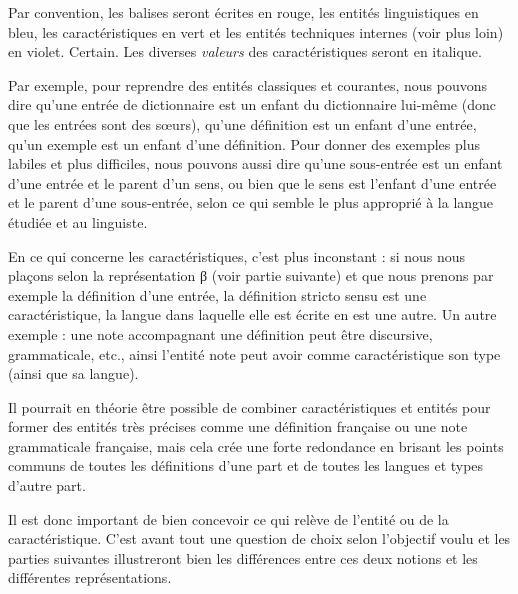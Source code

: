 \documentclass[10pt]{report}
\newcommand{\balise}[1]{\textcolor{red!80}{#1}}
\newcommand{\entité}[1]{\textcolor{blue!60!black}{#1}}
\newcommand{\caractéristique}[1]{\textcolor{green!60!black}{#1}}
\newcommand{\entitétechnique}[1]{\textcolor{blue!50!red}{#1}}
\begin{document}
Par convention, les \balise{balises} seront écrites en rouge, les \entité{entités linguistiques} en bleu, les \caractéristique{caractéristiques} en vert et les \entitétechnique{entités techniques internes} (voir plus loin) en violet. Certain. Les diverses \textit{valeurs} des caractéristiques seront en italique.

\bigskip

Par exemple, pour reprendre des entités classiques et courantes, nous pouvons dire qu’une \entité{entrée} de dictionnaire est un enfant du \entité{dictionnaire} lui-même (donc que les \entité{entrées} sont des sœurs), qu’une \entité{définition} est un enfant d’une \entité{entrée}, qu’un \entité{exemple} est un enfant d’une \entité{définition}. Pour donner des exemples plus labiles et plus difficiles, nous pouvons aussi dire qu’une \entité{sous-entrée} est un enfant d’une \entité{entrée} et le parent d’un \entité{sens}, ou bien que le \entité{sens} est l’enfant d’une \entité{entrée} et le parent d’une \entité{sous-entrée}, selon ce qui semble le plus approprié à la langue étudiée et au linguiste.

En ce qui concerne les caractéristiques, c’est plus inconstant : si nous nous plaçons selon la représentation β (voir partie suivante) et que nous prenons par exemple la \entité{définition} d’une \entité{entrée}, la \caractéristique{définition} stricto sensu est une caractéristique, la \caractéristique{langue} dans laquelle elle est écrite en est une autre. Un autre exemple : une \entité{note} accompagnant une \entité{définition} peut être discursive, grammaticale, etc., ainsi l’entité \entité{note} peut avoir comme caractéristique son \caractéristique{type} (ainsi que sa \caractéristique{langue}).

\bigskip

Il pourrait en théorie être possible de combiner caractéristiques et entités pour former des entités très précises comme une \entité{définition française} ou une \entité{note grammaticale française}, mais cela crée une forte redondance en brisant les points communs de toutes les \entité{définitions} d’une part et de toutes les \caractéristique{langues} et \caractéristique{types} d’autre part.

\bigskip

Il est donc important de bien concevoir ce qui relève de l’entité ou de la caractéristique. C’est avant tout une question de choix selon l’objectif voulu et les parties suivantes illustreront bien les différences entre ces deux notions et les différentes représentations.
\end{document}
